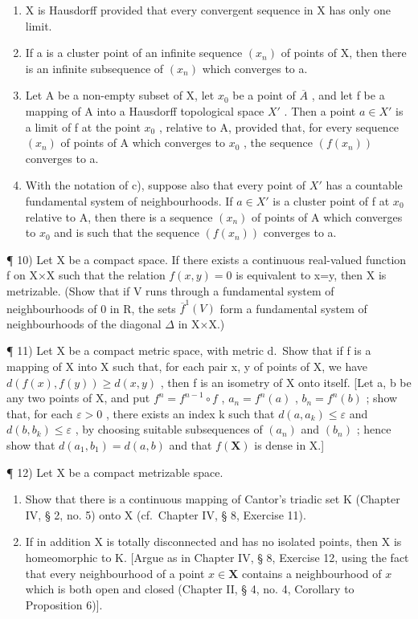 \begin{enumerate}
\def\labelenumi{\alph{enumi})}
\item
  X is Hausdorff provided that every convergent sequence in X has only one limit.
\item
  If a is a cluster point of an infinite sequence \((x_{n})\) of points of X, then there is an infinite subsequence of \((x_{n})\) which converges to a.
\item
  Let A be a non-empty subset of X, let \(x_{0}\) be a point of \(\overline{A}\) , and let f be a mapping of A into a Hausdorff topological space \(X'\) . Then a point \(a \in X'\) is a limit of f at the point \(x_{0}\) , relative to A, provided that, for every sequence \((x_{n})\) of points of A which converges to \(x_{0}\) , the sequence \((f(x_{n}))\) converges to a.
\item
  With the notation of c), suppose also that every point of \(X'\) has a countable fundamental system of neighbourhoods. If \(a \in X'\) is a cluster point of f at \(x_{0}\) relative to A, then there is a sequence \((x_{n})\) of points of A which converges to \(x_{0}\) and is such that the sequence \((f(x_{n}))\) converges to a.
\end{enumerate}

¶ 10) Let X be a compact space. If there exists a continuous real-valued function f on X×X such that the relation \(f(x,y)=0\) is equivalent to x=y, then X is metrizable. (Show that if V runs through a fundamental system of neighbourhoods of 0 in R, the sets \(\overline{f}^{1}(V)\) form a fundamental system of neighbourhoods of the diagonal \(\Delta\) in X×X.)

¶ 11) Let X be a compact metric space, with metric d.~Show that if f is a mapping of X into X such that, for each pair x, y of points of X, we have \(d(f(x), f(y)) \geqslant d(x, y)\) , then f is an isometry of X onto itself. {[}Let a, b be any two points of X, and put \(f^n = f^{n-1} \circ f\) , \(a_n = f^n(a)\) , \(b_n = f^n(b)\) ; show that, for each \(\varepsilon > 0\) , there exists an index k such that \(d(a, a_k) \leqslant \varepsilon\) and \(d(b, b_k) \leqslant \varepsilon\) , by choosing suitable subsequences of \((a_n)\) and \((b_n)\) ; hence show that \(d(a_1, b_1) = d(a, b)\) and that \(f(\mathbf{X})\) is dense in X.{]}

¶ 12) Let X be a compact metrizable space.

\begin{enumerate}
\def\labelenumi{\alph{enumi})}
\item
  Show that there is a continuous mapping of Cantor's triadic set K (Chapter IV, § 2, no. 5) onto X (cf.~Chapter IV, § 8, Exercise 11).
\item
  If in addition X is totally disconnected and has no isolated points, then X is homeomorphic to K. {[}Argue as in Chapter IV, § 8, Exercise 12, using the fact that every neighbourhood of a point \(x \in \mathbf{X}\) contains a neighbourhood of \(x\) which is both open and closed (Chapter II, § 4, no. 4, Corollary to Proposition 6){]}.
\end{enumerate}


